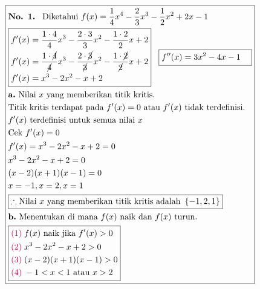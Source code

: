 \documentclass[13pt]{article}
\begin{document}
\par\noindent
\begin{fleqn}[4em]

\begin{align*}
\boxed{\begin{aligned}
  & \textbf{No. 1. } \text{ Diketahui }
    f(x) = \frac{1}{4} x^4 - \frac{2}{3} x^3 - \frac{1}{2} x^2 + 2x - 1 \\
  & \boxed{\begin{aligned}
    & f'(x) = \frac{1 \cdot 4}{4} x^3 - \frac{2 \cdot 3}{3} x^2 - \frac{1 \cdot 2}{2} x + 2 \\
    & f'(x) = \frac{1 \cdot \cancel{4}}{\cancel{4}} x^3 - \frac{2 \cdot \cancel{3}}{\cancel{3}} x^2 - \frac{1 \cdot \cancel{2}}{\cancel{2}} x + 2 \\
    & f'(x) = x^3 - 2x^2 - x + 2 \\
  \end{aligned}}\;~\;
  \boxed{\begin{aligned}[t]
    & f''(x) = 3x^2 - 4x - 1
  \end{aligned}} \\
  & \textbf{a.} \text{ Nilai } x \text{ yang memberikan titik kritis.} \\
  & \text{Titik kritis terdapat pada } f'(x) = 0 \text{ atau } f'(x) \text{ tidak terdefinisi.} \\
  & f'(x) \text{ terdefinisi untuk semua nilai } x \\
  & \text{Cek } f'(x) = 0 \\
  & f'(x) = x^3 - 2x^2 - x + 2 = 0 \\
  & x^3 - 2x^2 - x + 2 = 0 \\
  & (x - 2)(x + 1)(x - 1) = 0 \\
  & x = -1, x = 2, x = 1 \\
  & \boxed{\therefore \text{Nilai } x \text{ yang memberikan titik kritis adalah } \left\{-1, 2, 1\right\}} \\
  & \textbf{b.} \text{ Menentukan di mana } f(x) \text{ naik dan } f(x) \text{ turun.} \\
  & \boxed{\begin{aligned}
    & {\color{purple}(1)}\; f(x) \text{ naik jika } f'(x) > 0 \\
    & {\color{purple}(2)}\; x^3 - 2x^2 - x + 2 > 0 \\
    & {\color{purple}(3)}\; (x - 2)(x + 1)(x - 1) > 0 \\
    & {\color{purple}(4)}\; -1<x<1\text{ atau }x>2 \\

\end{aligned}}
\end{aligned}}
\end{align*}
\end{fleqn}
\end{document}
